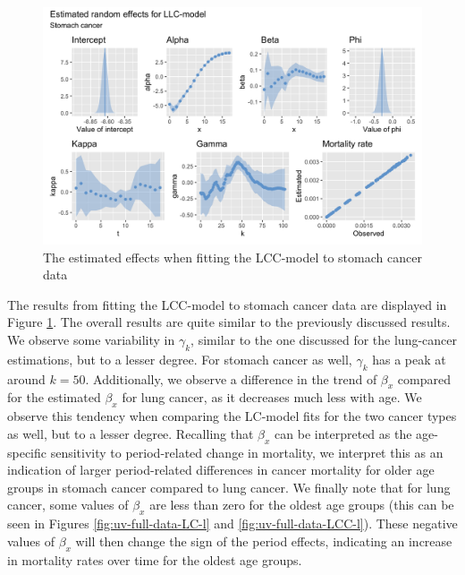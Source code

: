 \begin{figure}[h!]
    \centering
    \includegraphics[width=0.85\linewidth]{real-data/real-data-univariate/Figures/uv-full-data-lcc-s.png}
    \caption{The estimated effects when fitting the LCC-model to stomach cancer data}
    \label{fig:uv-full-data-LCC-s}
\end{figure}

\newpar The results from fitting the LCC-model to stomach cancer data are displayed in Figure \ref{fig:uv-full-data-LCC-s}. The overall results are quite similar to the previously discussed results. We observe some variability in $\gamma_k$, similar to the one discussed for the lung-cancer estimations, but to a lesser degree. For stomach cancer as well, $\gamma_k$ has a peak at around $k = 50$. Additionally, we observe a difference in the trend of $\beta_x$ compared for the estimated $\beta_x$ for lung cancer, as it decreases much less with age. We observe this tendency when comparing the LC-model fits for the two cancer types as well, but to a lesser degree. Recalling that $\beta_x$ can be interpreted as the age-specific sensitivity to period-related change in mortality, we interpret this as an indication of larger period-related differences in cancer mortality for older age groups in stomach cancer compared to lung cancer. We finally note that for lung cancer, some values of $\beta_x$ are less than zero for the oldest age groups (this can be seen in Figures \ref{fig:uv-full-data-LC-l} and \ref{fig:uv-full-data-LCC-l}). These negative values of $\beta_x$ will then change the sign of the period effects, indicating an increase in mortality rates over time for the oldest age groups. 


